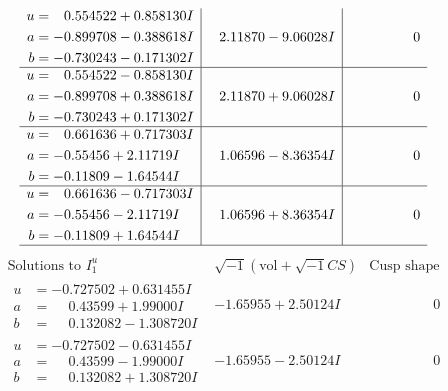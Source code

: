 \documentclass[1p]{elsarticle_modified}
\theoremstyle{definition}
\newcommand{\I}{\sqrt{-1}}
\begin{document}
$$\begin{array}{c|c|c}
\begin{aligned}
u &= \phantom{-}0.554522 + 0.858130 I \\
a &= -0.899708 - 0.388618 I \\
b &= -0.730243 - 0.171302 I\end{aligned}
 & \phantom{-}2.11870 - 9.06028 I & \phantom{-0.000000 } 0 \\ \hline\begin{aligned}
u &= \phantom{-}0.554522 - 0.858130 I \\
a &= -0.899708 + 0.388618 I \\
b &= -0.730243 + 0.171302 I\end{aligned}
 & \phantom{-}2.11870 + 9.06028 I & \phantom{-0.000000 } 0 \\ \hline\begin{aligned}
u &= \phantom{-}0.661636 + 0.717303 I \\
a &= -0.55456 + 2.11719 I \\
b &= -0.11809 - 1.64544 I\end{aligned}
 & \phantom{-}1.06596 - 8.36354 I & \phantom{-0.000000 } 0 \\ \hline\begin{aligned}
u &= \phantom{-}0.661636 - 0.717303 I \\
a &= -0.55456 - 2.11719 I \\
b &= -0.11809 + 1.64544 I\end{aligned}
 & \phantom{-}1.06596 + 8.36354 I & \phantom{-0.000000 } 0\\
 \hline 
 \end{array}$$\newpage$$\begin{array}{c|c|c}  
\text{Solutions to }I^u_{1}& \I (\text{vol} + \sqrt{-1}CS) & \text{Cusp shape}\\
 \hline 
\begin{aligned}
u &= -0.727502 + 0.631455 I \\
a &= \phantom{-}0.43599 + 1.99000 I \\
b &= \phantom{-}0.132082 - 1.308720 I\end{aligned}
 & -1.65955 + 2.50124 I & \phantom{-0.000000 } 0 \\ \hline\begin{aligned}
u &= -0.727502 - 0.631455 I \\
a &= \phantom{-}0.43599 - 1.99000 I \\
b &= \phantom{-}0.132082 + 1.308720 I\end{aligned}
 & -1.65955 - 2.50124 I & \phantom{-0.000000 } 0 \\ \hline\begin{aligned}

\end{aligned}
\end{array}$$
\end{document}

